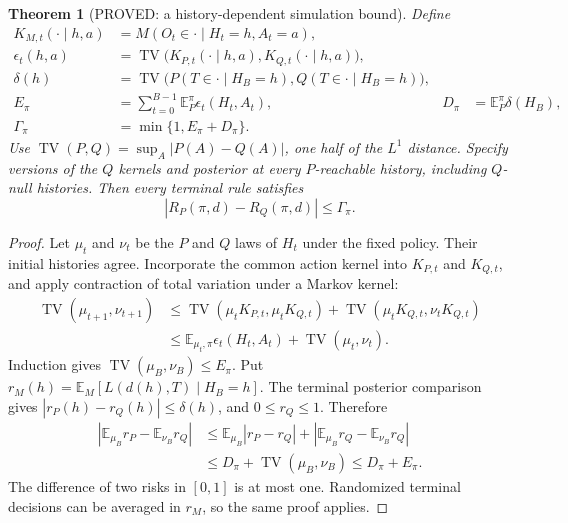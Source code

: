\documentclass[11pt]{article}
\newcommand{\E}{\mathbb E}
\newcommand{\TV}{\operatorname{TV}}
\newtheorem{theorem}{Theorem}[section]
\theoremstyle{definition}
\theoremstyle{remark}
\begin{document}
\begin{theorem}[PROVED: a history-dependent simulation bound]
Define
\begin{align*}
 K_{M,t}(\cdot\mid h,a)&=M(O_t\in\cdot\mid H_t=h,A_t=a),\\
 \epsilon_t(h,a)&=\TV\bigl(K_{P,t}(\cdot\mid h,a),
                              K_{Q,t}(\cdot\mid h,a)\bigr),\\
 \delta(h)&=\TV\bigl(P(T\in\cdot\mid H_B=h),
                         Q(T\in\cdot\mid H_B=h)\bigr),\\
 E_\pi&=\sum_{t=0}^{B-1}\E_P^\pi\epsilon_t(H_t,A_t),
 &D_\pi&=\E_P^\pi\delta(H_B),\\
 \Gamma_\pi&=\min\{1,E_\pi+D_\pi\}.
\end{align*}
Use $\TV(P,Q)=\sup_A|P(A)-Q(A)|$, one half of the $L^1$ distance.
Specify versions of the $Q$ kernels and posterior at every $P$-reachable
history, including $Q$-null histories.  Then every terminal rule satisfies
\begin{equation}
 |R_P(\pi,d)-R_Q(\pi,d)|\leq\Gamma_\pi.
 \label{eq:r3-sequential-simulation}
\end{equation}
\end{theorem}

\begin{proof}
Let $\mu_t$ and $\nu_t$ be the $P$ and $Q$ laws of $H_t$ under the fixed
policy.  Their initial histories agree.  Incorporate the common action
kernel into $K_{P,t}$ and $K_{Q,t}$, and apply contraction of total variation
under a Markov kernel:
\begin{align*}
 \TV(\mu_{t+1},\nu_{t+1})
 &\leq \TV(\mu_tK_{P,t},\mu_tK_{Q,t})
       +\TV(\mu_tK_{Q,t},\nu_tK_{Q,t})\\
 &\leq\E_{\mu_t,\pi}\epsilon_t(H_t,A_t)
       +\TV(\mu_t,\nu_t).
\end{align*}
Induction gives $\TV(\mu_B,\nu_B)\leq E_\pi$.
Put $r_M(h)=\E_M[L(d(h),T)\mid H_B=h]$.  The terminal posterior comparison
gives $|r_P(h)-r_Q(h)|\leq\delta(h)$, and $0\leq r_Q\leq1$.  Therefore
\begin{align*}
 |\E_{\mu_B}r_P-\E_{\nu_B}r_Q|
 &\leq\E_{\mu_B}|r_P-r_Q|
          +|\E_{\mu_B}r_Q-\E_{\nu_B}r_Q|\\
 &\leq D_\pi+\TV(\mu_B,\nu_B)\leq D_\pi+E_\pi.
\end{align*}
The difference of two risks in $[0,1]$ is at most one.  Randomized terminal
decisions can be averaged in $r_M$, so the same proof applies.
\end{proof}
\end{document}
